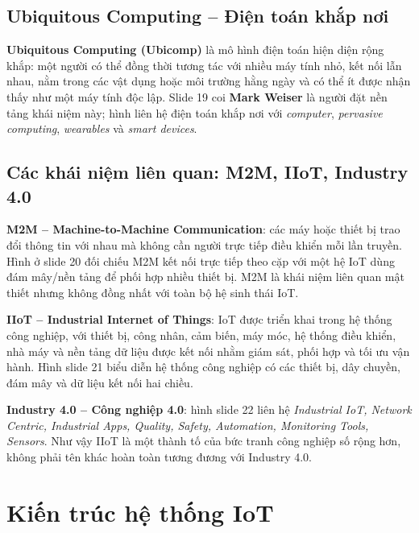 \subsection{Ubiquitous Computing -- Điện toán khắp nơi}
\textbf{Ubiquitous Computing (Ubicomp)} là mô hình điện toán hiện diện rộng khắp: một người có thể đồng thời tương tác với nhiều máy tính nhỏ, kết nối lẫn nhau, nằm trong các vật dụng hoặc môi trường hằng ngày và có thể ít được nhận thấy như một máy tính độc lập. Slide 19 coi \textbf{Mark Weiser} là người đặt nền tảng khái niệm này; hình liên hệ điện toán khắp nơi với \emph{computer}, \emph{pervasive computing}, \emph{wearables} và \emph{smart devices}.

\subsection{Các khái niệm liên quan: M2M, IIoT, Industry 4.0}
\textbf{M2M -- Machine-to-Machine Communication}: các máy hoặc thiết bị trao đổi thông tin với nhau mà không cần người trực tiếp điều khiển mỗi lần truyền. Hình ở slide 20 đối chiếu M2M kết nối trực tiếp theo cặp với một hệ IoT dùng đám mây/nền tảng để phối hợp nhiều thiết bị. M2M là khái niệm liên quan mật thiết nhưng không đồng nhất với toàn bộ hệ sinh thái IoT.

\textbf{IIoT -- Industrial Internet of Things}: IoT được triển khai trong hệ thống công nghiệp, với thiết bị, công nhân, cảm biến, máy móc, hệ thống điều khiển, nhà máy và nền tảng dữ liệu được kết nối nhằm giám sát, phối hợp và tối ưu vận hành. Hình slide 21 biểu diễn hệ thống công nghiệp có các thiết bị, dây chuyền, đám mây và dữ liệu kết nối hai chiều.

\textbf{Industry 4.0 -- Công nghiệp 4.0}: hình slide 22 liên hệ \emph{Industrial IoT, Network Centric, Industrial Apps, Quality, Safety, Automation, Monitoring Tools, Sensors}. Như vậy IIoT là một thành tố của bức tranh công nghiệp số rộng hơn, không phải tên khác hoàn toàn tương đương với Industry 4.0.

\section{Kiến trúc hệ thống IoT}\label{sec:architecture}
